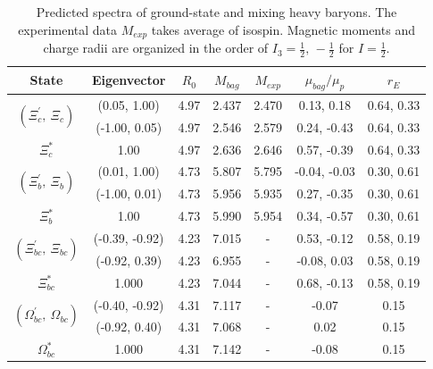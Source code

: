 \documentclass[prd,twocolumn,floatfix,nofootinbib]{revtex4}
\begin{document}
\renewcommand{\tabcolsep}{0.72cm}
\renewcommand{\arraystretch}{1.3}
\begin{table}[!htbp]
    \caption{Predicted spectra of ground-state and mixing heavy baryons. The experimental data $M_{exp}$ takes average of isospin.
    Magnetic moments and charge radii are organized in the order of $I_{3}=\frac{1}{2},\,-\frac{1}{2}$ for $I=\frac{1}{2}$.}
    \label{tab:mixingbaryon}
    \begin{tabular}{ccccccc}
        \hline\hline
        {\rm State}         &{\rm Eigenvector}  &$R_{0}$    &$M_{bag}$  &$M_{exp}$  &$\mu_{bag}/\mu_{p}$    &$r_{E}$ \\ \hline
        \multirow{2}{*}{$\left(\Xi_{c}^{\prime},\ \Xi_{c}\right)$}
                            &(0.05, 1.00)       &4.97	    &2.437	    &2.470      &0.13, 0.18             &0.64, 0.33 \\ 
                            &(-1.00, 0.05)      &4.97	    &2.546	    &2.579      &0.24, -0.43            &0.64, 0.33 \\ 
        $\Xi_{c}^{\ast}$ 	&1.00               &4.97	    &2.636	    &2.646      &0.57, -0.39            &0.64, 0.33 \\ 
        \multirow{2}{*}{$\left(\Xi_{b}^{\prime},\ \Xi_{b}\right)$}
                            &(0.01, 1.00)       &4.73	    &5.807	    &5.795      &-0.04, -0.03           &0.30, 0.61 \\ 
                            &(-1.00, 0.01)      &4.73	    &5.956	    &5.935      &0.27, -0.35            &0.30, 0.61 \\ 
        $\Xi_{b}^{\ast}$ 	&1.00               &4.73	    &5.990	    &5.954      &0.34, -0.57            &0.30, 0.61 \\ 
        \multirow{2}{*}{$\left(\Xi_{bc}^{\prime},\ \Xi_{bc}\right)$}
                            &(-0.39, -0.92)     &4.23	    &7.015	    &-          &0.53, -0.12            &0.58, 0.19 \\ 
                            &(-0.92, 0.39)      &4.23	    &6.955	    &-          &-0.08, 0.03            &0.58, 0.19 \\ 
        $\Xi_{bc}^{\ast}$ 	&1.000              &4.23	    &7.044	    &-          &0.68, -0.13            &0.58, 0.19 \\ 
        \multirow{2}{*}{$\left(\Omega_{bc}^{\prime},\ \Omega_{bc}\right)$}
                            &(-0.40, -0.92)     &4.31	    &7.117	    &-          &-0.07                  &0.15 \\ 
                            &(-0.92, 0.40)      &4.31	    &7.068	    &-          &0.02                   &0.15 \\ 
        $\Omega_{bc}^{\ast}$&1.000              &4.31	    &7.142	    &-          &-0.08                  &0.15 \\ 
        \hline\hline
    \end{tabular}
\end{table}
\end{document}
